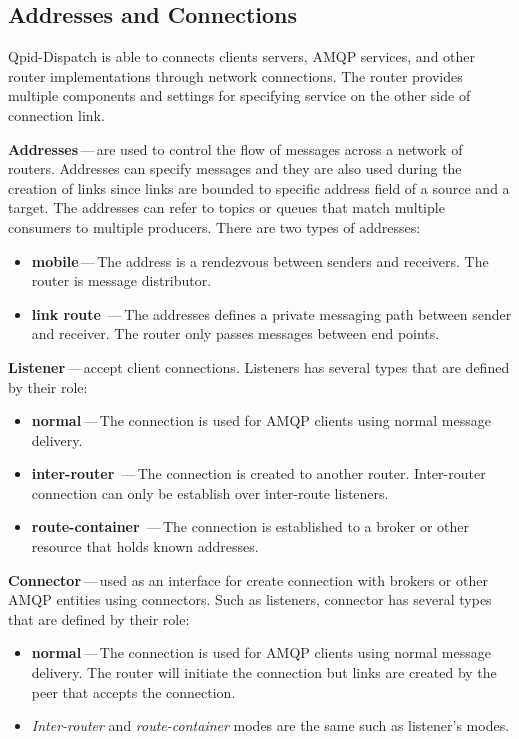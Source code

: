 \subsection{Addresses and Connections}
\label{Addresses and Connections}
Qpid-Dispatch is able to connects clients servers, AMQP services, and other router implementations through network connections. The router provides multiple components and settings for specifying service on the other side of connection link. 

\begin{description}
	\setlength\itemsep{0em}
	\item \textbf{Addresses\footnotemark{}}\,---\,are used to control the flow of messages across a network of routers. Addresses can specify messages and they are also used during the creation of links since links are bounded to specific address field of a source and a target. The addresses can refer to topics or queues that match multiple consumers to multiple producers. There are two types of addresses:
	\begin{itemize}
		\setlength\itemsep{0em}
		\item \textbf{mobile}\,---\,The address is a rendezvous between senders and receivers. The router is message distributor.
		\item \textbf{link route}	\,---\,The addresses defines a private messaging path between sender and receiver. The router only passes messages between end points.
	\end{itemize}	
	\item \textbf{Listener}\,---\,accept client connections. Listeners has several types that are defined by their role:
	\begin{itemize}
		\setlength\itemsep{0em}
		\item \textbf{normal}\,---\,The connection is used for AMQP clients using normal message delivery.
		\item \textbf{inter-router}	\,---\,The connection is created to another router. Inter-router connection can only be establish over inter-route listeners.
		\item \textbf{route-container}	\,---\,The connection is established to a broker or other resource that holds known addresses.
	\end{itemize}
	\item \textbf{Connector}\,---\,used as an interface for create connection with brokers or other AMQP entities using connectors. Such as listeners, connector has several types that are defined by their role:
	\begin{itemize}
		\setlength\itemsep{0em}
		\item \textbf{normal}\,---\,The connection is used for AMQP clients using normal message delivery. The router will initiate the connection but links are created by the peer that accepts the connection.
		\item \emph{Inter-router} and \emph{route-container} modes are the same such as listener's modes.
	\end{itemize}	
\end{description}

